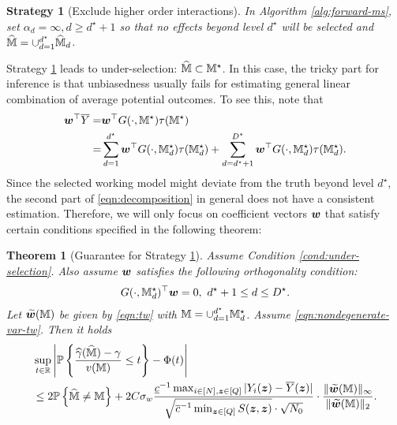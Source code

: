 \documentclass[12pt]{article}
\newtheorem{theorem}{Theorem}
\newtheorem{strategy}{Strategy}
\begin{document}
\begin{strategy}[Exclude higher order interactions]\label{str:exclude-all}
 In Algorithm \ref{alg:forward-ms}, set $\alpha_d = \infty,d\ge d^\star + 1$ so that no effects beyond level $d^\star$ will be selected and $\widehat{{\mathbb{M}}} = \cup_{d=1}^{d^\star}\widehat{{\mathbb{M}}}_{d}$. 
\end{strategy}

Strategy \ref{str:exclude-all} leads to under-selection: $\widehat{{\mathbb{M}}}\subset{{\mathbb{M}}}^\star$. In this case, the tricky part for inference is that unbiasedness usually fails for estimating general linear combination of average potential outcomes. To see this, note that
\begin{align}
    {\boldsymbol{w}}^\top \overline{Y} =& {\boldsymbol{w}}^\top G(\cdot,{\mathbb{M}}^\star)\tau({\mathbb{M}}^\star)\notag \\
    =&  \sum_{d=1}^{d^\star}{\boldsymbol{w}}^\top G(\cdot,{\mathbb{M}}^\star_d)\tau({\mathbb{M}}^\star_d) + \sum_{d=d^\star+1}^{D^\star} {\boldsymbol{w}}^\top G(\cdot,{\mathbb{M}}^\star_d)\tau({\mathbb{M}}^\star_d). \label{eqn:decomposition}
\end{align}
Since the selected working model might deviate from the truth beyond level $d^\star$, the second part of \eqref{eqn:decomposition} in general does not have a consistent estimation. Therefore, we will only focus on  coefficient vectors ${\boldsymbol{w}}$ that satisfy certain conditions specified in the following theorem: 

\begin{theorem}[Guarantee for Strategy \ref{str:exclude-all}]\label{thm:strategy-I}
Assume Condition \ref{cond:under-selection}. Also assume ${\boldsymbol{w}}$ satisfies the following orthogonality condition: 
\begin{align}\label{eqn:orthogonality}
    G(\cdot, {\mathbb{M}}_d^{\star})^\top{\boldsymbol{w}} = 0, ~d^\star +1 \le d \le D^\star.
\end{align}
Let $ \widetilde{{\boldsymbol{w}}}({\mathbb{M}})$ be given by \eqref{eqn:tw} with ${\mathbb{M}} = \cup_{d=1}^{d^\star}{\mathbb{M}}^\star_d$. Assume \eqref{eqn:nondegenerate-var-tw}. 
Then it holds
\begin{align}\label{eqn:tail-under-ms}
    &\sup_{t\in{\mathbb{R}}}\left|{{\mathbb{P}}\left\{\frac{{\widehat{\gamma}}(\widehat{{\mathbb{M}}})-\gamma}{v({\mathbb{M}})} \le t\right\}} - \Phi(t)\right| \notag\\
    &\le 2{{\mathbb{P}}\left\{\widehat{{\mathbb{M}}}\neq {\mathbb{M}}\right\}} +  2C\sigma_w   \frac{\underline{c}^{-1} \max_{i\in[N],{\boldsymbol{z}}\in[Q]}|Y_i({\boldsymbol{z}})-\overline{Y}({\boldsymbol{z}})|}{\sqrt{\overline{c}^{-1} \min_{{\boldsymbol{z}}\in[Q]} S({\boldsymbol{z}},{\boldsymbol{z}})}\cdot \sqrt{N_0}}\cdot  \frac{\|\widetilde{{\boldsymbol{w}}}({\mathbb{M}})\|_\infty}{\|\widetilde{{\boldsymbol{w}}}({\mathbb{M}})\|_2} .
\end{align}
\end{theorem}
\end{document}
